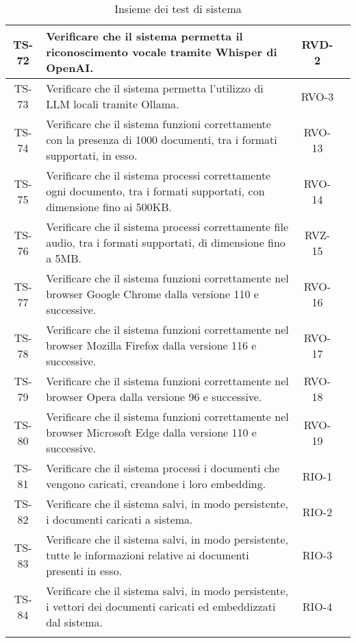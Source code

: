 \begin{xltabular}{\textwidth}{| c | X | c | c |}
    \hline
    TS-72 & Verificare che il sistema permetta il riconoscimento vocale tramite Whisper di OpenAI. & RVD-2 & \textcolor{xmarkcolor}{}\\
    \hline
    TS-73 & Verificare che il sistema permetta l'utilizzo di LLM locali tramite Ollama. & RVO-3 & \textcolor{cmarkcolor}{} \\
    \hline
    TS-74 & Verificare che il sistema funzioni correttamente con la presenza di 1000 documenti, tra i formati supportati, in esso. & RVO-13 & \textcolor{cmarkcolor}{}\\
    \hline
    TS-75 & Verificare che il sistema processi correttamente ogni documento, tra i formati supportati, con dimensione fino ai 500KB. & RVO-14 & \textcolor{cmarkcolor}{} \\
    \hline
    TS-76 & Verificare che il sistema processi correttamente file audio, tra i formati supportati, di dimensione fino a 5MB. & RVZ-15 & \textcolor{xmarkcolor}{} \\
    \hline
    TS-77 & Verificare che il sistema funzioni correttamente nel browser Google Chrome dalla versione 110 e successive. & RVO-16 & \textcolor{cmarkcolor}{} \\
    \hline
    TS-78 & Verificare che il sistema funzioni correttamente nel browser Mozilla Firefox dalla versione 116 e successive. & RVO-17 & \textcolor{cmarkcolor}{} \\
    \hline
    TS-79 & Verificare che il sistema funzioni correttamente nel browser Opera dalla versione 96 e successive. & RVO-18 & \textcolor{cmarkcolor}{} \\
    \hline
    TS-80 & Verificare che il sistema funzioni correttamente nel browser Microsoft Edge dalla versione 110 e successive. & RVO-19 & \textcolor{cmarkcolor}{} \\
    \hline
    TS-81 & Verificare che il sistema processi i documenti che vengono caricati, creandone i loro embedding. & RIO-1 & \textcolor{cmarkcolor}{} \\
    \hline
    TS-82 & Verificare che il sistema salvi, in modo persistente, i documenti caricati a sistema. & RIO-2 & \textcolor{cmarkcolor}{} \\
    \hline
    TS-83 & Verificare che il sistema salvi, in modo persistente, tutte le informazioni relative ai documenti presenti in esso. & RIO-3 & \textcolor{cmarkcolor}{} \\
    \hline
    TS-84 & Verificare che il sistema salvi, in modo persistente, i vettori dei documenti caricati ed embeddizzati dal sistema. & RIO-4 & \textcolor{cmarkcolor}{} \\
    \hline
     \caption{Insieme dei test di sistema}
    \label{tab:test}
\end{xltabular}
\endgroup

